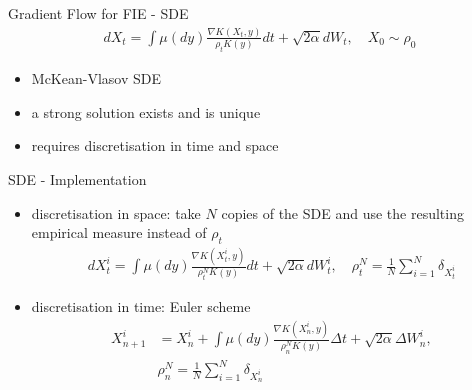 \documentclass[aspectratio=149]{beamer}
\begin{document}
\begin{frame}{Gradient Flow for FIE - SDE}
\begin{align*}
dX_{t}=\int\mu\left(dy\right)\frac{\nabla K(X_{t},y)}{\rho_{t}K(y)}dt+\sqrt{2\alpha}dW_{t},\quad X_{0}\sim\rho_{0}
\end{align*}

\begin{itemize}
\item McKean-Vlasov SDE
\item a strong solution exists and is unique
\item requires discretisation in time and space
\end{itemize}
\end{frame}

\begin{frame}{SDE - Implementation}
\begin{itemize}
\item discretisation in space: take $N$ copies of the SDE and use the resulting empirical measure instead of $\rho_t$
\begin{align*}
dX_{t}^{i}=\int\mu\left(dy\right)\frac{\nabla K(X_{t}^{i},y)}{\rho_{t}^{N}K(y)}dt+\sqrt{2\alpha}dW_{t}^{i},\quad\rho_{t}^{N}=\frac{1}{N}\sum_{i=1}^{N}\delta_{X_{t}^{i}}
\end{align*}
\item discretisation in time: Euler scheme
\begin{align*}
X_{n+1}^{i}& =X_{n}^{i}+\int\mu\left(dy\right)\frac{\nabla K(X_{n}^{i},y)}{\rho_{n}^{N}K(y)}\Delta t+\sqrt{2\alpha}\Delta W^{i}_n,\\
&\rho_{n}^{N}=\frac{1}{N}\sum_{i=1}^{N}\delta_{X_{n}^{i}}
\end{align*}
\end{itemize}
\end{frame}
\end{document}

